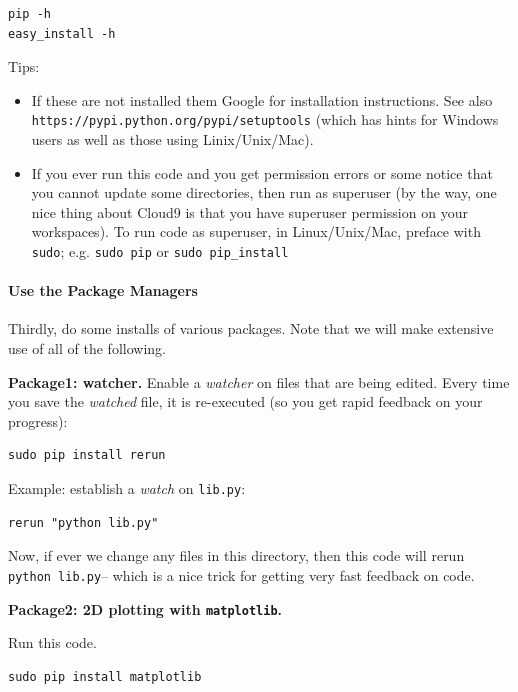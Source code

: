 \begin{lstlisting}
pip -h
easy_install -h
\end{lstlisting}

Tips:

\begin{itemize}
\itemsep1pt\parskip0pt
\item
  If these are not installed them Google for installation instructions.
  See also \texttt{https://pypi.python.org/pypi/setuptools} (which has
  hints for Windows users as well as those using Linix/Unix/Mac).
\item
  If you ever run this code and you get permission errors or some notice
  that you cannot update some directories, then run as superuser (by the
  way, one nice thing about Cloud9 is that you have superuser permission
  on your workspaces). To run code as superuser, in Linux/Unix/Mac,
  preface with \texttt{sudo}; e.g. \texttt{sudo\ pip} or
  \texttt{sudo\ pip\_install}
\end{itemize}

\paragraph{Use the Package Managers}\label{use-the-package-managers}

Thirdly, do some installs of various packages. Note that we will make
extensive use of all of the following.

\textbf{Package1: watcher.} Enable a \emph{watcher} on files that are
being edited. Every time you save the \emph{watched} file, it is
re-executed (so you get rapid feedback on your progress):

\begin{lstlisting}
sudo pip install rerun
\end{lstlisting}

Example: establish a \emph{watch} on \texttt{lib.py}:

\begin{lstlisting}
rerun "python lib.py"
\end{lstlisting}

Now, if ever we change any files in this directory, then this code will
rerun \texttt{python\ lib.py}-- which is a nice trick for getting very
fast feedback on code.

\textbf{Package2: 2D plotting with \texttt{matplotlib}.}

Run this code.

\begin{lstlisting}
sudo pip install matplotlib
\end{lstlisting}

